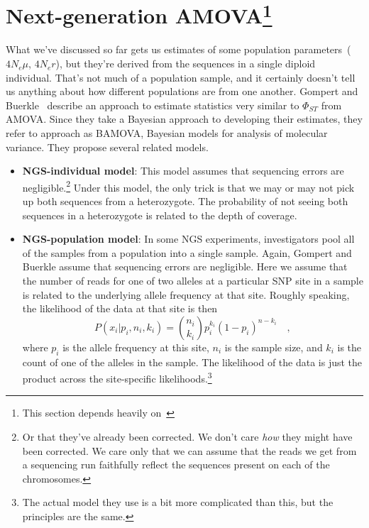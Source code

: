 \section*{Next-generation AMOVA\footnote{This section depends heavily on~\cite{Gompert-Buerkle-2011}}}

What we've discussed so far gets us estimates of some population
parameters~($4N_e\mu$, $4N_er$), but they're derived from the
sequences in a single diploid individual. That's not much of a
population sample, and it certainly doesn't tell us anything about how
different populations are from one another. Gompert and
Buerkle~\cite{Gompert-Buerkle-2011} describe an approach to estimate
statistics very similar to $\Phi_{ST}$ from AMOVA. Since they take a
Bayesian approach to developing their estimates, they refer to
approach as BAMOVA, Bayesian models for analysis of molecular
variance. They propose several related models.

\begin{itemize}

\item {\bf NGS-individual model}: This model assumes that sequencing
  errors are negligible.\footnote{Or that they've already been
    corrected. We don't care {\it how\/} they might have been
    corrected. We care only that we can assume that the reads we get
    from a sequencing run faithfully reflect the sequences present on
    each of the chromosomes.} Under this model, the only trick is that
  we may or may not pick up both sequences from a heterozygote. The
  probability of not seeing both sequences in a heterozygote is
  related to the depth of coverage.

\item {\bf NGS-population model}: In some NGS experiments,
  investigators pool all of the samples from a population into a
  single sample. Again, Gompert and Buerkle assume that sequencing
  errors are negligible. Here we assume that the number of reads for
  one of two alleles at a particular SNP site in a sample is related
  to the underlying allele frequency at that site. Roughly speaking,
  the likelihood of the data at that site is then
\[
P(x_i|p_i,n_i, k_i) = {n_i \choose k_i}p_i^{k_i}(1-p_{i})^{n-k_i}
\quad ,
\]
where $p_i$ is the allele frequency at this site, $n_i$ is the sample
size, and $k_i$ is the count of one of the alleles in the sample. The
likelihood of the data is just the product across the site-specific
likelihoods.\footnote{The actual model they use is a bit more
  complicated than this, but the principles are the same.}

\end{itemize}

